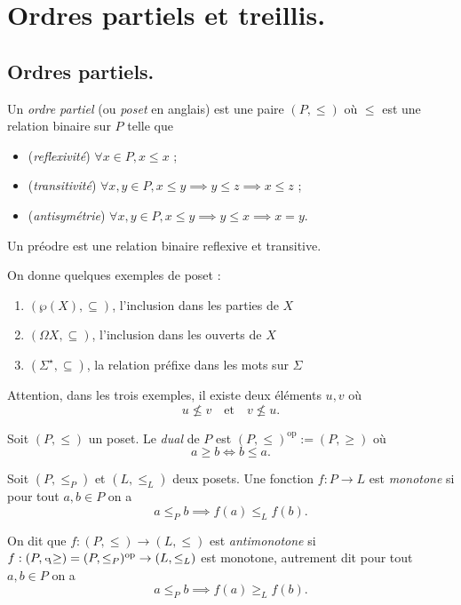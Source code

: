 \documentclass[./main]{subfiles}
\begin{document}

  \chapter{Ordres partiels et treillis.}

  \section{Ordres partiels.}
  \begin{defn}
    Un \textit{ordre partiel} (ou \textit{poset} en anglais) est une paire $(P,{\le})$ où $\le$ est une relation binaire sur $P$ telle que 
    \begin{itemize}
      \item (\textit{reflexivité}) $\forall  x \in P, x \le x$ ;
      \item (\textit{transitivité}) $\forall x, y \in P, x \le y \implies y \le z \implies x \le z$ ;
      \item (\textit{antisymétrie}) $\forall x, y \in P, x \le y \implies y \le x \implies x = y$.
    \end{itemize}

    Un préodre est une relation binaire reflexive et transitive.
  \end{defn}

  \begin{exm}
    On donne quelques exemples de poset :
    \begin{enumerate}
      \item $(\wp(X), \subseteq)$, l'inclusion dans les parties de $X$
      \item $(\Omega X, \subseteq)$, l'inclusion dans les ouverts de $X$
      \item $(\Sigma^\star, \subseteq)$, la relation préfixe dans les mots sur $\Sigma$
    \end{enumerate}
    Attention, dans les trois exemples, il existe deux éléments $u, v$ où
    \[
      u \not\le v
      \quad\text{et}\quad
      v \not\le u
    .\] 
  \end{exm}

  \begin{defn}[Dual]
    Soit $(P, \le)$ un poset.
    Le \textit{dual} de $P$ est $(P, \le)^\mathrm{op} := (P, \ge)$ où
    \[
    a \ge b \iff b \le a
    .\] 
  \end{defn}

  \begin{defn}
    Soit $(P, \le_P)$ et $(L, \le_L)$ deux posets.
    Une fonction $f : P \to L$ est \textit{monotone} si pour tout $a, b \in P$ on a 
    \[
    a \le_P b \implies f(a) \le_L f(b)
    .\]

    On dit que $f : (P, \le) \to (L, \le)$ est \textit{antimonotone} si $f : {(P, \flip{\le_P})} = (P, \le_P)^\mathrm{op} \to (L, \le_L)$ est monotone, autrement dit pour tout $a, b \in P$ on a  
    \[
      a \le_P b \implies f(a) \ge_L f(b)
    .\]
  \end{defn}
\end{document}
